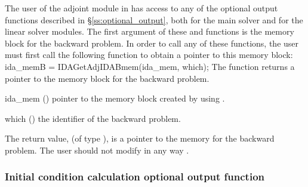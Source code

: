 The user of the adjoint module in {\idas} has access to any of the optional output 
functions described in \S\ref{ss:optional_output}, both for the main solver and for
the linear solver modules. The first argument of these  and 
functions is the {\idas} memory block for the backward problem. In order to call any of these
functions, the user must first call the following function to obtain a pointer to
this memory block:
{
  ida\_memB = IDAGetAdjIDABmem(ida\_mem, which);
}
{
  The function  returns a pointer to the {\idas}
  memory block for the backward problem.
}
{
  \begin{args}
  \item[ida\_mem] ()
    pointer to the {\idas} memory block created by using .
  \item[which] ()
    the identifier of the backward problem.
  \end{args}
}
{
  The return value,  (of type ), is a pointer to the
  {\idas} memory for the backward problem.
}
{
  {\warn}The user should not modify in any way .
}


\subsubsection{Initial condition calculation optional output function}
\label{sss:optout_iccalcB}

